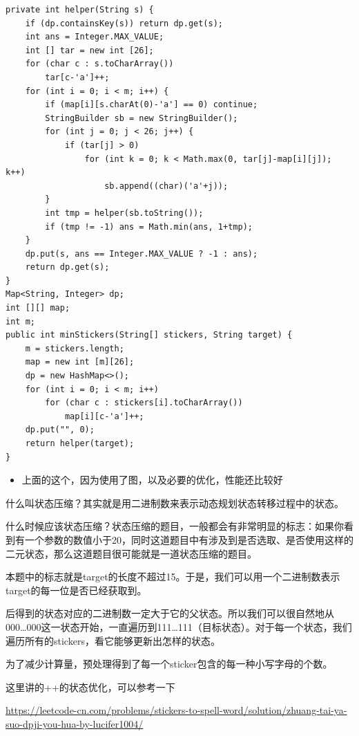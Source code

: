 \documentclass[9pt, b5paper]{article}
\begin{document}
\begin{verbatim}
private int helper(String s) {
    if (dp.containsKey(s)) return dp.get(s);
    int ans = Integer.MAX_VALUE;
    int [] tar = new int [26];
    for (char c : s.toCharArray())
        tar[c-'a']++;
    for (int i = 0; i < m; i++) {
        if (map[i][s.charAt(0)-'a'] == 0) continue;
        StringBuilder sb = new StringBuilder();
        for (int j = 0; j < 26; j++) {
            if (tar[j] > 0)
                for (int k = 0; k < Math.max(0, tar[j]-map[i][j]); k++)
                    sb.append((char)('a'+j));
        }
        int tmp = helper(sb.toString());
        if (tmp != -1) ans = Math.min(ans, 1+tmp);
    }
    dp.put(s, ans == Integer.MAX_VALUE ? -1 : ans);
    return dp.get(s);
}
Map<String, Integer> dp;
int [][] map;
int m;
public int minStickers(String[] stickers, String target) {
    m = stickers.length;
    map = new int [m][26];
    dp = new HashMap<>();
    for (int i = 0; i < m; i++) 
        for (char c : stickers[i].toCharArray()) 
            map[i][c-'a']++;
    dp.put("", 0);
    return helper(target);
}
\end{verbatim}
\begin{itemize}
\item 上面的这个，因为使用了图，以及必要的优化，性能还比较好
\end{itemize}

什么叫状态压缩？其实就是用二进制数来表示动态规划状态转移过程中的状态。

什么时候应该状态压缩？状态压缩的题目，一般都会有非常明显的标志：如果你看到有一个参数的数值小于20，同时这道题目中有涉及到是否选取、是否使用这样的二元状态，那么这道题目很可能就是一道状态压缩的题目。

本题中的标志就是target的长度不超过15。于是，我们可以用一个二进制数表示target的每一位是否已经获取到。

后得到的状态对应的二进制数一定大于它的父状态。所以我们可以很自然地从000\ldots{}000这一状态开始，一直遍历到111\ldots{}111（目标状态）。对于每一个状态，我们遍历所有的stickers，看它能够更新出怎样的状态。

为了减少计算量，预处理得到了每一个sticker包含的每一种小写字母的个数。

这里讲的++的状态优化，可以参考一下

\url{https://leetcode-cn.com/problems/stickers-to-spell-word/solution/zhuang-tai-ya-suo-dpji-you-hua-by-lucifer1004/}
\end{document}
